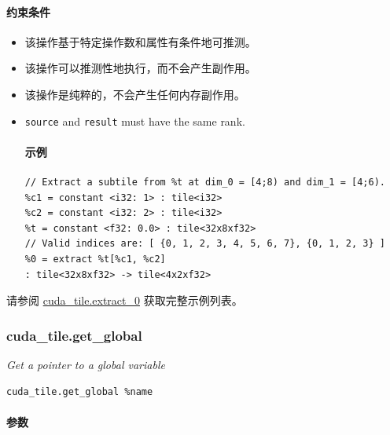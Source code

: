 \documentclass{article}
\begin{document}
\paragraph{约束条件}

\begin{itemize}
\item 该操作基于特定操作数和属性有条件地可推测。
\item 该操作可以推测性地执行，而不会产生副作用。
\item 该操作是纯粹的，不会产生任何内存副作用。
\item \texttt{source} and \texttt{result} must have the same rank.


\paragraph{示例}

\begin{lstlisting}
// Extract a subtile from %t at dim_0 = [4;8) and dim_1 = [4;6).
%c1 = constant <i32: 1> : tile<i32>
%c2 = constant <i32: 2> : tile<i32>
%t = constant <f32: 0.0> : tile<32x8xf32>
// Valid indices are: [ {0, 1, 2, 3, 4, 5, 6, 7}, {0, 1, 2, 3} ]
%0 = extract %t[%c1, %c2]
: tile<32x8xf32> -> tile<4x2xf32>
\end{lstlisting}

\end{itemize}
请参阅 \href{https://docs.nvidia.com/cuda/tile-ir/latest/sections/appendix.html#example-cuda-tile-extract-0}{cuda\_tile.extract\_0} 获取完整示例列表。



\subsubsection{cuda\_tile.get\_global}

\textit{Get a pointer to a global variable}


\begin{lstlisting}
cuda_tile.get_global %name
\end{lstlisting}

\paragraph{参数}
\end{document}
